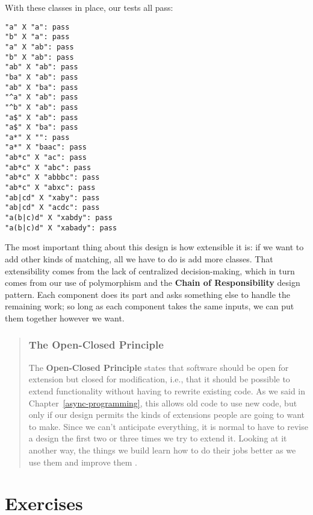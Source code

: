 \documentclass[krantzl]{krantz}
\newcommand{\chapref}[1]{Chapter~\ref{#1}}
\newcommand{\glossref}[1]{\textbf{#1}}
\newenvironment{callout}{\savenotes\begin{tBox}\begin{quotation}\toggletrue{inbox}\renewcommand{\thempfootnote}{\arabic{footnote}}}{\end{quotation}\vspace{\baselineskip}\end{tBox}\togglefalse{inbox}\spewnotes}
\begin{document}
With these classes in place,
our tests all pass:


\begin{lstlisting}[frame=tblr,backgroundcolor=\color{black!5}]
"a" X "a": pass
"b" X "a": pass
"a" X "ab": pass
"b" X "ab": pass
"ab" X "ab": pass
"ba" X "ab": pass
"ab" X "ba": pass
"^a" X "ab": pass
"^b" X "ab": pass
"a$" X "ab": pass
"a$" X "ba": pass
"a*" X "": pass
"a*" X "baac": pass
"ab*c" X "ac": pass
"ab*c" X "abc": pass
"ab*c" X "abbbc": pass
"ab*c" X "abxc": pass
"ab|cd" X "xaby": pass
"ab|cd" X "acdc": pass
"a(b|c)d" X "xabdy": pass
"a(b|c)d" X "xabady": pass
\end{lstlisting}



The most important thing about this design is how extensible it is:
if we want to add other kinds of matching,
all we have to do is add more classes.
That extensibility comes from the lack of centralized decision-making,
which in turn comes from our use of polymorphism
and the \glossref{Chain of Responsibility} design pattern.
Each component does its part and asks something else to handle the remaining work;
so long as each component takes the same inputs,
we can put them together however we want.

\begin{callout}


\subsubsection*{The Open-Closed Principle}


The \glossref{Open-Closed Principle} states that
software should be open for extension but closed for modification,
i.e., that it should be possible to extend functionality
without having to rewrite existing code.
As we said in \chapref{async-programming},
this allows old code to use new code,
but only if our design permits the kinds of extensions people are going to want to make.
Since we can’t anticipate everything,
it is normal to have to revise a design the first two or three times we try to extend it.
Looking at it another way,
the things we build learn how to do their jobs better
as we use them and improve them \cite{Brand1995}.

\end{callout}

\section{Exercises}\label{pattern-matching-exercises}
\end{document}

